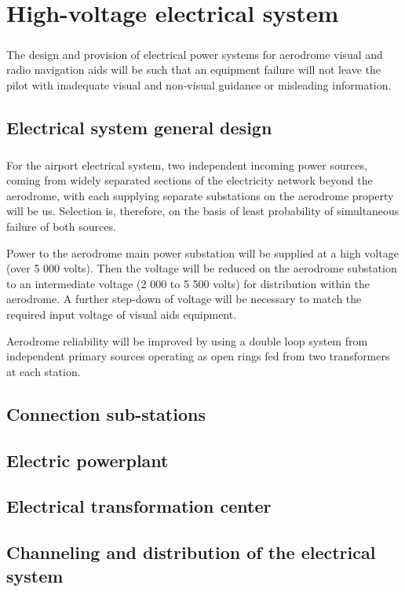 \chapter{High-voltage electrical system}
\paragraph{} The design and provision of electrical power systems for aerodrome visual and radio navigation aids will be such that an equipment failure will not leave the pilot with inadequate visual and non-visual guidance or misleading information.

	\section{Electrical system general design}
	\paragraph{} For the airport electrical system, two independent incoming power sources, coming from widely separated sections of the electricity network beyond the aerodrome, with each supplying separate substations on the aerodrome property will be us. Selection is, therefore, on the basis of least probability of simultaneous failure of both sources.
	
	Power to the aerodrome main power substation will be supplied at a high voltage (over 5 000 volts). Then the voltage will be reduced on the aerodrome substation to an intermediate voltage (2 000 to 5 500 volts) for distribution within the aerodrome. A further step-down of voltage will be necessary to match the required input voltage of visual aids equipment.
	
	Aerodrome reliability will be improved by using a double loop system from independent primary sources operating as open rings fed from two transformers at each station.
	
	\section{Connection sub-stations}
	
	\section{Electric powerplant}
	
	\section{Electrical transformation center}
	
	\section{Channeling and distribution of the electrical system}
	